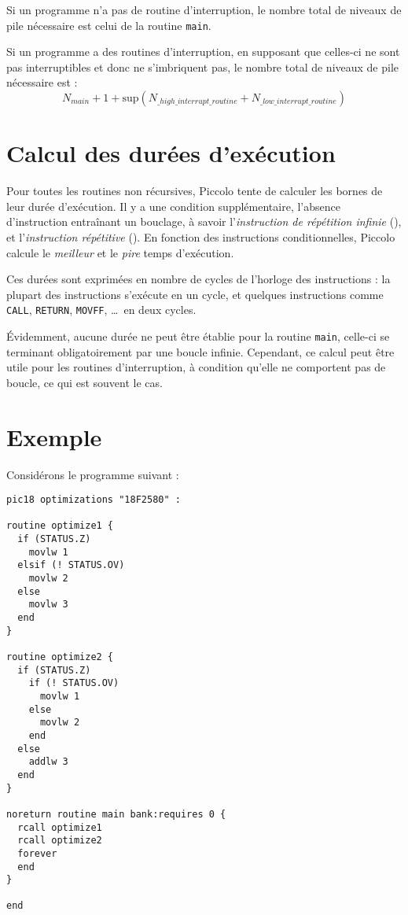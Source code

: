 Si un programme n'a pas de routine d'interruption, le nombre total de niveaux de pile nécessaire est celui de la routine \texttt{main}.


Si un programme a des routines d'interruption, en supposant que celles-ci ne sont pas interruptibles et donc ne s'imbriquent pas, le nombre total de niveaux de pile nécessaire est :
\begin{equation*}
  N_{main} + 1 + \text{sup} \left(N_{\_high\_interrupt\_routine} + N_{\_low\_interrupt\_routine}\right)
\end{equation*}



\section{Calcul des durées d'exécution}

Pour toutes les routines non récursives, Piccolo tente de calculer les bornes de leur durée d'exécution. Il y a une condition supplémentaire, l'absence d'instruction entraînant un bouclage, à savoir l'\emph{instruction de répétition infinie} (), et l'\emph{instruction répétitive} (). En fonction des instructions conditionnelles, Piccolo calcule le \emph{meilleur} et le \emph{pire} temps d'exécution.

Ces durées sont exprimées en nombre de cycles de l'horloge des instructions : la plupart des instructions s'exécute en un cycle, et quelques instructions comme \texttt{CALL}, \texttt{RETURN}, \texttt{MOVFF}, \dots\ en deux cycles.

Évidemment, aucune durée ne peut être établie pour la routine \texttt{main}, celle-ci se terminant obligatoirement par une boucle infinie. Cependant, ce calcul peut être utile pour les routines d'interruption, à condition qu'elle ne comportent pas de boucle, ce qui est souvent le cas.

\section{Exemple}

Considérons le programme suivant :

\begin{lstlisting}[language=piccolo]
pic18 optimizations "18F2580" :

routine optimize1 {
  if (STATUS.Z)
    movlw 1
  elsif (! STATUS.OV)
    movlw 2
  else
    movlw 3
  end
}

routine optimize2 {
  if (STATUS.Z)
    if (! STATUS.OV)
      movlw 1
    else
      movlw 2
    end
  else
    addlw 3
  end
}

noreturn routine main bank:requires 0 {
  rcall optimize1
  rcall optimize2
  forever
  end
}

end
\end{lstlisting}

